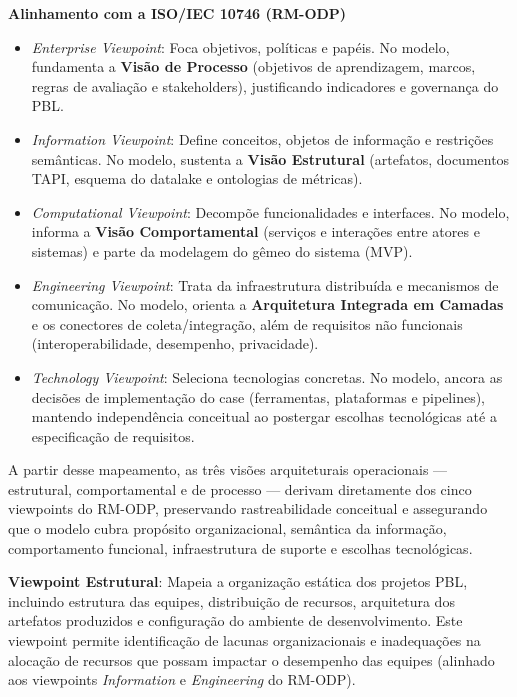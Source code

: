\documentclass[12pt,a4paper]{article}
\begin{document}
\textbf{Alinhamento com a ISO/IEC 10746 (RM-ODP)}

\begin{itemize}
  \item \textit{Enterprise Viewpoint}: Foca objetivos, políticas e papéis. No modelo, fundamenta a \textbf{Visão de Processo} (objetivos de aprendizagem, marcos, regras de avaliação e stakeholders), justificando indicadores e governança do PBL.
  \item \textit{Information Viewpoint}: Define conceitos, objetos de informação e restrições semânticas. No modelo, sustenta a \textbf{Visão Estrutural} (artefatos, documentos TAPI, esquema do datalake e ontologias de métricas).
  \item \textit{Computational Viewpoint}: Decompõe funcionalidades e interfaces. No modelo, informa a \textbf{Visão Comportamental} (serviços e interações entre atores e sistemas) e parte da modelagem do gêmeo do sistema (MVP).
  \item \textit{Engineering Viewpoint}: Trata da infraestrutura distribuída e mecanismos de comunicação. No modelo, orienta a \textbf{Arquitetura Integrada em Camadas} e os conectores de coleta/integração, além de requisitos não funcionais (interoperabilidade, desempenho, privacidade).
  \item \textit{Technology Viewpoint}: Seleciona tecnologias concretas. No modelo, ancora as decisões de implementação do case (ferramentas, plataformas e pipelines), mantendo independência conceitual ao postergar escolhas tecnológicas até a especificação de requisitos.
\end{itemize}

A partir desse mapeamento, as três visões arquiteturais operacionais — estrutural,
comportamental e de processo — derivam diretamente dos cinco viewpoints do
RM-ODP, preservando rastreabilidade conceitual e assegurando que o modelo cubra
propósito organizacional, semântica da informação, comportamento funcional,
infraestrutura de suporte e escolhas tecnológicas.

\textbf{Viewpoint Estrutural}: Mapeia a organização estática dos projetos PBL, incluindo estrutura das equipes, distribuição de recursos, arquitetura dos artefatos produzidos e configuração do ambiente de desenvolvimento. Este viewpoint permite identificação de lacunas organizacionais e inadequações na alocação de recursos que possam impactar o desempenho das equipes (alinhado aos viewpoints \textit{Information} e \textit{Engineering} do RM-ODP).
\end{document}
